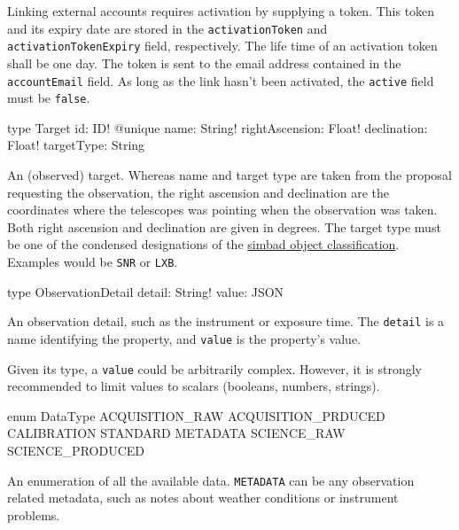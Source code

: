 Linking external accounts requires activation by supplying a token. This token and its expiry date are stored in the \verb|activationToken| and \verb|activationTokenExpiry| field, respectively. The life time of an activation token shall be one day. The token is sent to the email address contained in the \verb|accountEmail| field. As long as the link hasn't been activated, the \verb|active| field must be \verb|false|.


\begin{code}
type Target {
  id: ID! @unique
  name: String!
  rightAscension: Float!
  declination: Float!
  targetType: String
}
\end{code}

An (observed) target. Whereas name and target type are taken from the proposal requesting the observation, the right ascension and declination are the coordinates where the telescopes was pointing when the observation was taken. Both right ascension and declination are given in degrees. The target type must be one of the condensed designations of the \href{http://cds.u-strasbg.fr/cgi-bin/Otype?IR}{\Gls{simbad} object classification}. Examples would be \verb|SNR| or \verb|LXB|.


\begin{code}
type ObservationDetail {
  detail: String!
  value: JSON
}
\end{code}

An observation detail, such as the instrument or exposure time. The \verb|detail| is a name identifying the property, and \verb|value| is the property's value.

\begin{note}
Given its type, a \verb|value| could be arbitrarily complex. However, it is strongly recommended to limit values to scalars (booleans, numbers, strings).
\end{note}


\begin{code}
enum DataType {
  ACQUISITION_RAW
  ACQUISITION_PRDUCED
  CALIBRATION
  STANDARD
  METADATA
  SCIENCE_RAW
  SCIENCE_PRODUCED
}
\end{code}

An enumeration of all the available data. \verb|METADATA| can be any observation related metadata, such as notes about weather conditions or instrument problems.

